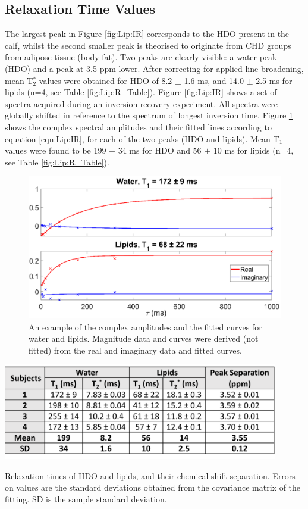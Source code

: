 \documentclass[class=article, crop=false]{standalone}
\begin{document}
\subsection{Relaxation Time Values}

The largest peak in Figure \ref{fig:Lip:IR} corresponds to the HDO present in the calf, whilst the second smaller peak is theorised to originate from CHD groups from adipose tissue (body fat). Two peaks are clearly visible: a water peak (HDO) and a peak at 3.5 ppm lower. After correcting for applied line-broadening, mean T$_2^*$ values were obtained for HDO of 8.2 $\pm$ 1.6 ms, and 14.0 $\pm$ 2.5 ms for lipids (n=4, see Table \ref{fig:Lip:R_Table}). Figure \ref{fig:Lip:IR} shows a set of spectra acquired during an inversion-recovery experiment. All spectra were globally shifted in reference to the spectrum of longest inversion time. Figure \ref{fig:Lip:Amp_Tau} shows the complex spectral amplitudes and their fitted lines according to equation \ref{eqn:Lip:IR}, for each of the two peaks (HDO and lipids). Mean T$_1$ values were found to be 199 $\pm$ 34 ms for HDO and 56 $\pm$ 10 ms for lipids (n=4, see Table \ref{fig:Lip:R_Table}).

\begin{figure}
    \centering
    \includegraphics[width=1\textwidth]{Figures/Lipid/Amp_Tau.png}
    \caption{An example of the complex amplitudes and the fitted curves for water and lipids. Magnitude data and curves were derived (not fitted) from the real and imaginary data and fitted curves. }
    \label{fig:Lip:Amp_Tau}
\end{figure}

\begin{table}
    \centering
    \includegraphics[width=0.9\textwidth]{Figures/Lipid/Relaxation_Table.png}
    \caption{Relaxation times of HDO and lipids, and their chemical shift separation. Errors on values are the standard deviations obtained from the covariance matrix of the fitting. SD is the sample standard deviation.}
    \label{fig:Lip:R_Table}
\end{table}
\end{document}
